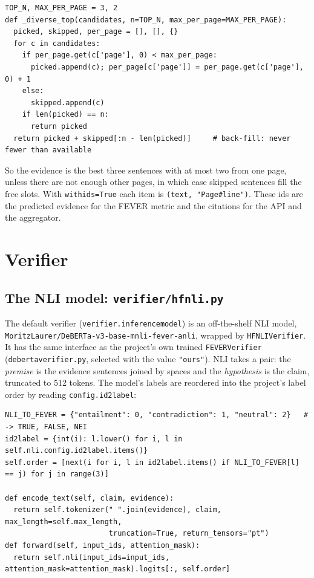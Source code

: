 \documentclass[11pt,a4paper]{article}
\makeatletter
\DeclareRobustCommand{\_}{\ifmmode\nfss@text{\textunderscore}\else\textunderscore\allowbreak\fi}
\newcommand{\file}[1]{\texttt{#1}}
\makeatother
\begin{document}
\begin{lstlisting}
TOP_N, MAX_PER_PAGE = 3, 2
def _diverse_top(candidates, n=TOP_N, max_per_page=MAX_PER_PAGE):
  picked, skipped, per_page = [], [], {}
  for c in candidates:
    if per_page.get(c['page'], 0) < max_per_page:
      picked.append(c); per_page[c['page']] = per_page.get(c['page'], 0) + 1
    else:
      skipped.append(c)
    if len(picked) == n:
      return picked
  return picked + skipped[:n - len(picked)]     # back-fill: never fewer than available
\end{lstlisting}

So the evidence is the best three sentences with at most two from one page, unless there are not enough other pages,
in which case skipped sentences fill the free slots. With \texttt{with\_ids=True} each item is
\texttt{(text, "Page\#line")}. These ids are the predicted evidence for the FEVER metric and the citations for
the API and the aggregator.

\section{Verifier}

\subsection{The NLI model: \file{verifier/hf\_nli.py}}

The default verifier (\texttt{verifier.inference\_model}) is an off-the-shelf NLI model,
\texttt{MoritzLaurer/\allowbreak DeBERTa-v3-base-mnli-fever-anli}, wrapped by \texttt{HFNLIVerifier}. It has the same interface as
the project's own trained \texttt{FEVERVerifier} (\file{deberta\_verifier.py}, selected with the value
\texttt{"ours"}). NLI takes a pair: the \emph{premise} is the evidence sentences joined by spaces and the
\emph{hypothesis} is the claim, truncated to 512 tokens. The model's labels are reordered into the project's label
order by reading \texttt{config.id2label}:

\begin{lstlisting}
NLI_TO_FEVER = {"entailment": 0, "contradiction": 1, "neutral": 2}   # -> TRUE, FALSE, NEI
id2label = {int(i): l.lower() for i, l in self.nli.config.id2label.items()}
self.order = [next(i for i, l in id2label.items() if NLI_TO_FEVER[l] == j) for j in range(3)]

def encode_text(self, claim, evidence):
  return self.tokenizer(" ".join(evidence), claim, max_length=self.max_length,
                        truncation=True, return_tensors="pt")
def forward(self, input_ids, attention_mask):
  return self.nli(input_ids=input_ids, attention_mask=attention_mask).logits[:, self.order]
\end{lstlisting}
\end{document}
